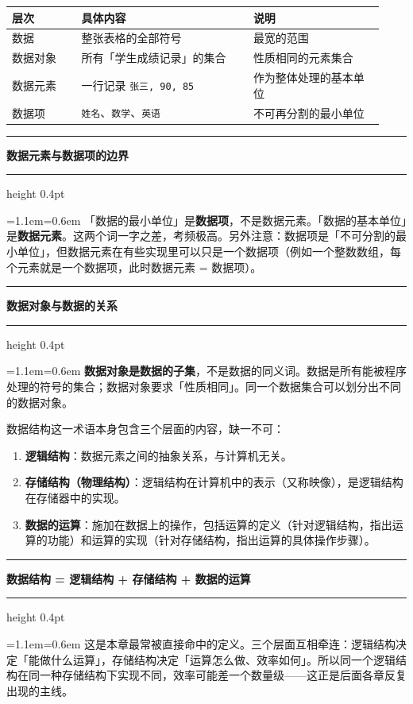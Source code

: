 \documentclass[11pt,openany,UTF8]{ctexbook}
\newcommand{\callouthead}[2]{%
  \par\addvspace{7pt}\noindent
  {\color{#1}\rule[-0.15em]{3pt}{1.05em}}\hspace{0.5em}%
  {\bfseries\color{#1}#2}\par\nobreak\vspace{-0.35em}%
  {\color{rulesep}\hrule height 0.4pt}\nobreak\vspace{0.45em}%
  \begingroup\small\setlength{\parindent}{0pt}%
  \leftskip=1.1em\rightskip=0.6em\noindent\ignorespaces}
\newcommand{\calloutend}{\par\endgroup\addvspace{7pt}}
\newenvironment{callkey}[1]{\callouthead{keybar}{#1}}{\calloutend}
\newenvironment{callwarn}[1]{\callouthead{warnbar}{#1}}{\calloutend}
\begin{document}
\begingroup\small\setlength{\tabcolsep}{4.0pt}
\begin{longtable}{@{}L{0.1752\linewidth}L{0.4292\linewidth}L{0.3241\linewidth}@{}}
\toprule
\textbf{层次} & \textbf{具体内容} & \textbf{说明} \\
\midrule
\endhead
数据 & 整张表格的全部符号 & 最宽的范围 \\
数据对象 & 所有「学生成绩记录」的集合 & 性质相同的元素集合 \\
数据元素 & 一行记录 \texttt{张三,\allowbreak{} 90,\allowbreak{} 85} & 作为整体处理的基本单位 \\
数据项 & \texttt{姓名}、\texttt{数学}、\texttt{英语} & 不可再分割的最小单位 \\
\bottomrule
\end{longtable}
\endgroup

\begin{callwarn}{数据元素与数据项的边界}
「数据的最小单位」是\textbf{数据项}，不是数据元素。「数据的基本单位」是\textbf{数据元素}。这两个词一字之差，考频极高。另外注意：数据项是「不可分割的最小单位」，但数据元素在有些实现里可以只是一个数据项（例如一个整数数组，每个元素就是一个数据项，此时数据元素 = 数据项）。

\end{callwarn}

\begin{callwarn}{数据对象与数据的关系}
\textbf{数据对象是数据的子集}，不是数据的同义词。数据是所有能被程序处理的符号的集合；数据对象要求「性质相同」。同一个数据集合可以划分出不同的数据对象。

\end{callwarn}

数据结构这一术语本身包含三个层面的内容，缺一不可：

\begin{enumerate}
\item \textbf{逻辑结构}：数据元素之间的抽象关系，与计算机无关。
\item \textbf{存储结构（物理结构）}：逻辑结构在计算机中的表示（又称映像），是逻辑结构在存储器中的实现。
\item \textbf{数据的运算}：施加在数据上的操作，包括运算的定义（针对逻辑结构，指出运算的功能）和运算的实现（针对存储结构，指出运算的具体操作步骤）。
\end{enumerate}
\begin{callkey}{数据结构 = 逻辑结构 + 存储结构 + 数据的运算}
这是本章最常被直接命中的定义。三个层面互相牵连：逻辑结构决定「能做什么运算」，存储结构决定「运算怎么做、效率如何」。所以同一个逻辑结构在同一种存储结构下实现不同，效率可能差一个数量级——这正是后面各章反复出现的主线。

\end{callkey}
\end{document}
